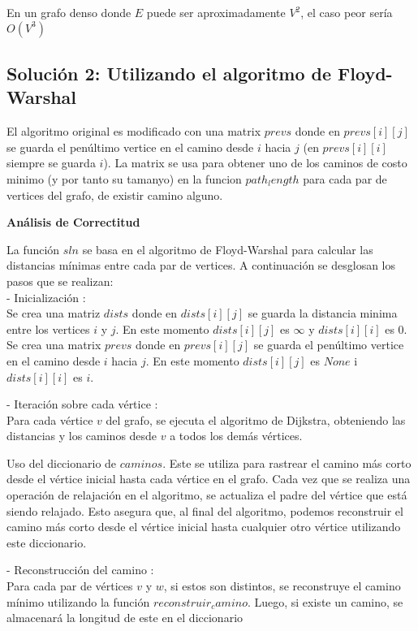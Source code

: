 \documentclass[
10pt, %
a4paper, %
oneside, %
headinclude,footinclude, %
BCOR5mm, %
]{scrartcl}
\begin{document}
En un grafo denso donde $E$ puede ser aproximadamente $V^2$, el caso peor sería $O(V^3)$


\subsection{Solución 2: Utilizando el algoritmo de Floyd-Warshal}

El algoritmo original es modificado con una matrix $prevs$ donde en $prevs[i][j]$ se guarda el penúltimo vertice en el camino desde $i$ hacia $j$ (en $prevs[i][i]$ siempre se guarda $i$).
La matrix se usa para obtener uno de los caminos de costo minimo (y por tanto su tamanyo) en la funcion $path_length$ para cada par de vertices del grafo, de existir camino alguno.


\textbf{Análisis de Correctitud}

La función $sln$ se basa en el algoritmo de Floyd-Warshal para calcular las distancias mínimas entre cada par de vertices. A continuación se desglosan los pasos que se realizan:\\


- Inicialización :\\
Se crea una matriz $dists$ donde en $dists[i][j]$ se guarda la distancia minima entre los vertices $i$ y $j$. En este momento $dists[i][j]$ es $\infty$ y $dists[i][i]$ es $0$.
Se crea una matrix $prevs$ donde en $prevs[i][j]$ se guarda el penúltimo vertice en el camino desde $i$ hacia $j$. En este momento $dists[i][j]$ es $None$ i $dists[i][i]$ es $i$.


- Iteración sobre cada vértice :\\ 
Para cada vértice $v$ del grafo, se ejecuta el algoritmo de Dijkstra, obteniendo las distancias y los caminos desde $v$
a todos los demás vértices.

Uso del diccionario de $caminos$. Este se utiliza para rastrear el camino más corto desde el vértice inicial hasta cada 
vértice en el grafo. Cada vez que se realiza una operación de relajación en el algoritmo, se actualiza el padre del vértice 
que está siendo relajado. Esto asegura que, al final del algoritmo, podemos reconstruir el camino más corto desde el vértice inicial
hasta cualquier otro vértice utilizando este diccionario.


- Reconstrucción del camino : \\
Para cada par de vértices $v$ y $w$, si estos son distintos, se reconstruye el camino mínimo utilizando la función $reconstruir_camino$. Luego, 
si existe un camino, se almacenará la longitud de este en el diccionario\\
\end{document}
